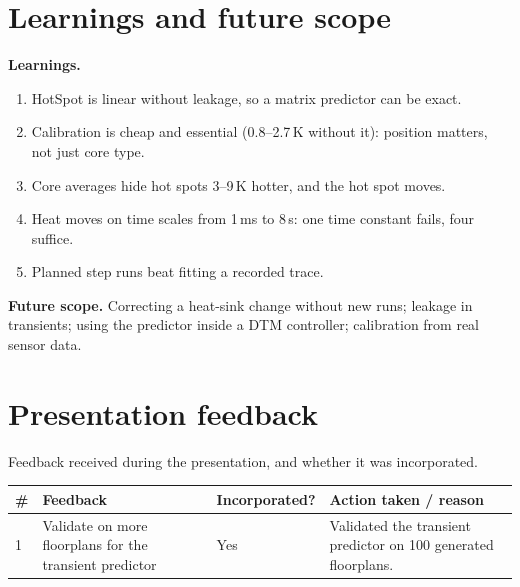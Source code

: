 \documentclass[11pt,a4paper]{article}
\begin{document}
\section{Learnings and future scope}
\textbf{Learnings.}
\begin{enumerate}
  \item HotSpot is linear without leakage, so a matrix predictor can be exact.
  \item Calibration is cheap and essential (0.8--2.7\,K without it): position
        matters, not just core type.
  \item Core averages hide hot spots 3--9\,K hotter, and the hot spot moves.
  \item Heat moves on time scales from 1\,ms to 8\,s: one time constant fails, four suffice.
  \item Planned step runs beat fitting a recorded trace.
\end{enumerate}

\textbf{Future scope.} Correcting a heat-sink change without new runs; leakage in transients;
using the predictor inside a DTM controller; calibration from real sensor data.

\section{Presentation feedback}
Feedback received during the presentation, and whether it was incorporated.
\begin{center}
\small
\begin{tabular}{@{}p{0.6cm} p{5.5cm} p{2.2cm} p{6.2cm}@{}}
\toprule
\# & Feedback & Incorporated? & Action taken / reason \\
\midrule
1 & Validate on more floorplans for the transient predictor & Yes & Validated the transient
    predictor on 100 generated floorplans. \\
\bottomrule
\end{tabular}
\end{center}

\end{document}
